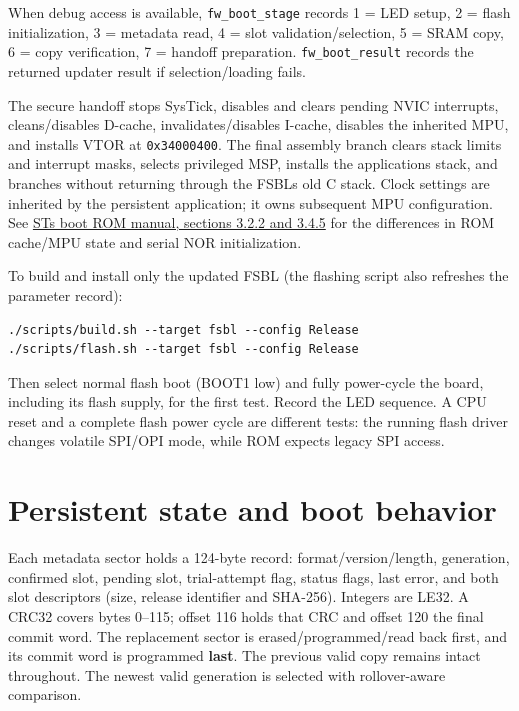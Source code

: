 \documentclass[10pt,a4paper,oneside]{report}
\begin{document}
When debug access is available, \texttt{fw\_\allowbreak{}boot\_\allowbreak{}stage} records 1 = LED setup, 2 = flash initialization, 3 = metadata read, 4 = slot validation/selection, 5 = SRAM copy, 6 = copy verification, 7 = handoff preparation. \texttt{fw\_\allowbreak{}boot\_\allowbreak{}result} records the returned updater result if selection/loading fails.

The secure handoff stops SysTick, disables and clears pending NVIC interrupts, cleans/disables D-cache, invalidates/disables I-cache, disables the inherited MPU, and installs VTOR at \texttt{0x34000400}. The final assembly branch clears stack limits and interrupt masks, selects privileged MSP, installs the application\textquotesingle s stack, and branches without returning through the FSBL\textquotesingle s old C stack. Clock settings are inherited by the persistent application; it owns subsequent MPU configuration. See \href{https://www.st.com/resource/en/user_manual/um3234-how-to-proceed-with-boot-rom-on-stm32n6-mcus-stmicroelectronics.pdf}{ST\textquotesingle s boot ROM manual, sections 3.2.2 and 3.4.5} for the differences in ROM cache/MPU state and serial NOR initialization.

To build and install only the updated FSBL (the flashing script also refreshes the parameter record):

\begin{verbatim}
./scripts/build.sh --target fsbl --config Release
./scripts/flash.sh --target fsbl --config Release
\end{verbatim}

Then select normal flash boot (BOOT1 low) and fully power-cycle the board, including its flash supply, for the first test. Record the LED sequence. A CPU reset and a complete flash power cycle are different tests: the running flash driver changes volatile SPI/OPI mode, while ROM expects legacy SPI access.

\section{Persistent state and boot behavior}\label{wiki-firmware-firmware-updates--persistent-state-and-boot-behavior}

Each metadata sector holds a 124-byte record: format/version/length, generation, confirmed slot, pending slot, trial-attempt flag, status flags, last error, and both slot descriptors (size, release identifier and SHA-256). Integers are LE32. A CRC32 covers bytes 0--115; offset 116 holds that CRC and offset 120 the final commit word. The replacement sector is erased/programmed/read back first, and its commit word is programmed \textbf{last}. The previous valid copy remains intact throughout. The newest valid generation is selected with rollover-aware comparison.
\end{document}
